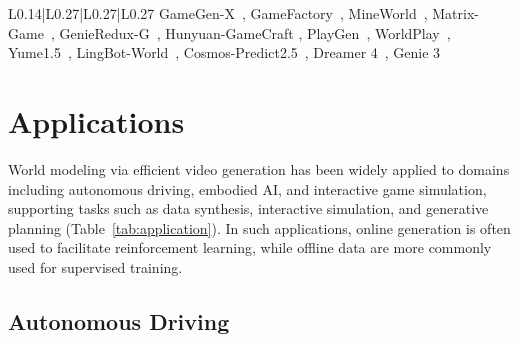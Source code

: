 \documentclass[lettersize,journal]{IEEEtran}
\begin{document}
\begin{table}[t]
{\begin{tabular}{L{0.14\textwidth}|L{0.27\textwidth}|L{0.27\textwidth}|L{0.27\textwidth}}
{GameGen-X~\cite{che2024gamegen}, GameFactory~\cite{yu2025gamefactory},
MineWorld~\cite{guo2025mineworld}, Matrix-Game~\cite{zhang2025matrixgame,he2025matrix},
GenieRedux-G~\cite{savov2025exploration}, Hunyuan-GameCraft
\cite{li2025hunyuangamecrafthighdynamicinteractivegame,tang2025hunyuan}, PlayGen~\cite{yang2024playablegamegeneration}, WorldPlay~\cite{sun2025worldplay}, Yume1.5~\cite{mao2025yume}, LingBot-World~\cite{robbyantteam2026advancingopensourceworldmodels}, Cosmos-Predict2.5~\cite{ali2025world}, Dreamer 4~\cite{hafner2025dreamerv4}, Genie 3~\cite{deepmind_genie3_models}
}\\
\bottomrule
\end{tabular}%
}
\label{tab:application}
\end{table}
\section{Applications}
\label{sec:applications}
World modeling via efficient video generation has been widely applied to domains including autonomous driving, embodied AI, and interactive game simulation, supporting tasks such as data synthesis, interactive simulation, and generative planning (Table~\ref{tab:application}). In such applications, online generation is often used to facilitate reinforcement learning, while offline data are more commonly used for supervised training.
\subsection{Autonomous Driving}
\end{document}
